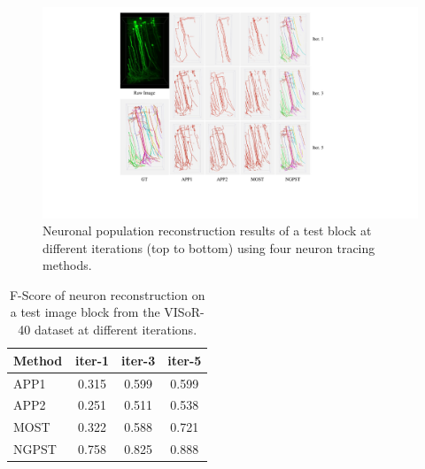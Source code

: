\begin{figure}[t]
	\centering
	\includegraphics[width=1\columnwidth]{./Illustrations/trace_iterations3.pdf}
	\caption{Neuronal population reconstruction results of a test block at different iterations (top to bottom) using four neuron tracing methods.} 
	\label{fig:trace_iterations}
\end{figure}


\begin{table}[t]
	\centering
	\caption{F-Score of neuron reconstruction on a test image block from the VISoR-40 dataset at different iterations.%
	}
	\label{table:trace_iterations}
	\begin{tabular}{lccc}
		\toprule
		Method & iter-1 & iter-3 & iter-5\\
		\midrule
		APP1~\cite{Peng2011}
		& 0.315 & 0.599 & 0.599\\
		APP2~\cite{Xiao2013}
		& 0.251 & 0.511 & 0.538\\
		MOST~\cite{Wu2014}          
		& 0.322 & 0.588 & 0.721\\
		NGPST~\cite{Quan2015}
		& 0.758 & 0.825 & 0.888\\
		\bottomrule
	\end{tabular}
\end{table}

